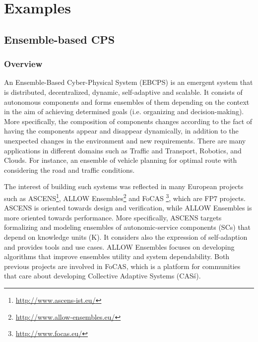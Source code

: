 \chapter{Examples}
\label{ch:examples}
\label{ch:catalog}

\section{Ensemble-based CPS}  

\subsection{Overview}
An Ensemble-Based Cyber-Physical System (EBCPS) is an emergent system that is distributed, decentralized, dynamic, self-adaptive and scalable. It consists of autonomous components and forms ensembles of them depending on the context in the aim of achieving determined goals (i.e. organizing and decision-making). More specifically, the composition of components changes according to the fact of having the components appear and disappear dynamically, in addition to the unexpected changes in the environment and new requirements. There are many applications in different domains such as Traffic and Transport, Robotics, and Clouds. For instance, an ensemble of vehicle planning for optimal route with considering the road and traffic conditions. 

The interest of building such systems was reflected in many European projects such as ASCENS\footnote{\url{http://www.ascens-ist.eu/}}, ALLOW Ensembles\footnote{\url{http://www.allow-ensembles.eu/}} and FoCAS \footnote{\url{http://www.focas.eu/}}, which are FP7 projects. ASCENS is oriented towards design and verification, while ALLOW Ensembles is more oriented towards performance. More specifically, ASCENS targets formalizing and modeling ensembles of autonomic-service components (SCs) that depend on knowledge units (K). It considers also the expression of self-adaption and provides tools and use cases. ALLOW Ensembles focuses on developing algorithms that improve ensembles utility and system dependability. Both previous projects are involved in FoCAS, which is a platform for communities that care about developing Collective Adaptive Systems (CAS\' s).

